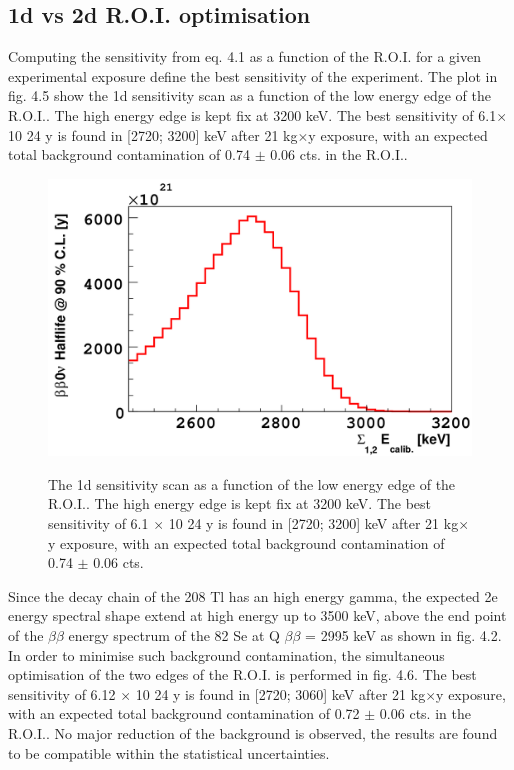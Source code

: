 \documentclass[main.tex]{subfiles}
\begin{document}
\FloatBarrier


\subsection{1d vs 2d R.O.I. optimisation}


\NI Computing the sensitivity from eq. 4.1 as a function of the R.O.I. for a given experimental exposure define the best sensitivity of the experiment. The plot in fig. 4.5 show the 1d sensitivity scan as a function of the low energy edge of the R.O.I.. The high energy edge is kept fix at 3200 keV. The best sensitivity of 6.1$\times$10 24 y is found in [2720; 3200] keV after 21 kg$\times$y exposure, with an expected total background contamination of 0.74 $\pm$ 0.06 cts. in the R.O.I..


\begin{figure}[h!]
\centering
\includegraphics[scale=0.25]{pictures/Chap4/Sens0nu1D.png}
\label{Sens0nu1D.png}
\caption{The 1d sensitivity scan as a function of the low energy edge of the R.O.I.. The high energy edge is kept fix at 3200 keV. The best sensitivity of 6.1 $\times$ 10 24 y is found in [2720; 3200] keV after 21 kg$\times$y exposure, with an
expected total background contamination of 0.74 $\pm$ 0.06 cts.}
\end{figure}


\bigskip

\NI Since the decay chain of the 208 Tl has an high energy gamma, the expected 2e energy spectral shape extend at high energy up to 3500 keV, above the end point of the $\beta\beta$ energy spectrum of the 82 Se at Q $\beta\beta$ = 2995 keV as shown in fig. 4.2. In order to minimise such background contamination, the simultaneous optimisation of the two edges of the R.O.I. is performed in fig. 4.6. The best sensitivity of 6.12 $\times$ 10 24 y is found in [2720; 3060] keV after 21 kg$\times$y exposure, with an expected total background contamination of 0.72 $\pm$ 0.06 cts. in the R.O.I.. No major reduction of the background is observed, the results are found to be compatible within the statistical uncertainties.
\end{document}
